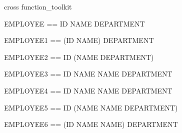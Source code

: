 \begin{zsection}
\SECTION cross \parents function\_toolkit
\end{zsection}

\begin{zed}
\end{zed}

%
%
%

\begin{zed}
EMPLOYEE == ID \cross NAME \cross DEPARTMENT \\
\end{zed}
\begin{zed}
EMPLOYEE1 == (ID \cross NAME) \cross DEPARTMENT \\
\end{zed}
\begin{zed}
EMPLOYEE2 == ID \cross (NAME \cross DEPARTMENT) \\
\end{zed}
\begin{zed}
EMPLOYEE3 == ID \cross NAME \cup NAME \cross DEPARTMENT \\
\end{zed}
\begin{zed}
EMPLOYEE4 == ID \cross NAME \rel NAME \cross DEPARTMENT \\
\end{zed}
\begin{zed}
EMPLOYEE5 == ID \cross (NAME \cup NAME \cross DEPARTMENT) \\
\end{zed}
\begin{zed}
EMPLOYEE6 == (ID \cross NAME \rel NAME) \cross DEPARTMENT \\
\end{zed}
